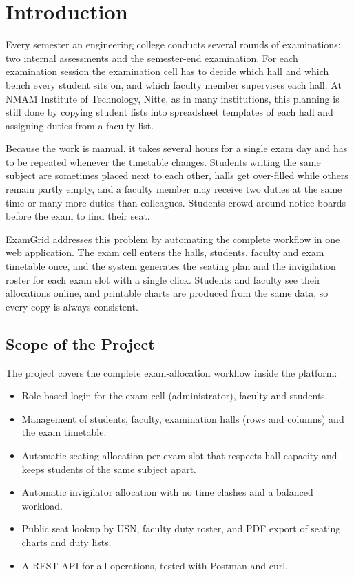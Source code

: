 \documentclass[12pt,letterpaper]{article}
\renewcommand{\thesection}{\arabic{section}}
\newcommand{\chapter}[1]{\clearpage\refstepcounter{section}\section*{#1}\label{ch:\thesection}}
\begin{document}
\pagestyle{body}

\chapter{Introduction}
Every semester an engineering college conducts several rounds of examinations: two internal assessments and the semester-end examination. For each examination session the examination cell has to decide which hall and which bench every student sits on, and which faculty member supervises each hall. At NMAM Institute of Technology, Nitte, as in many institutions, this planning is still done by copying student lists into spreadsheet templates of each hall and assigning duties from a faculty list.

Because the work is manual, it takes several hours for a single exam day and has to be repeated whenever the timetable changes. Students writing the same subject are sometimes placed next to each other, halls get over-filled while others remain partly empty, and a faculty member may receive two duties at the same time or many more duties than colleagues. Students crowd around notice boards before the exam to find their seat.

ExamGrid addresses this problem by automating the complete workflow in one web application. The exam cell enters the halls, students, faculty and exam timetable once, and the system generates the seating plan and the invigilation roster for each exam slot with a single click. Students and faculty see their allocations online, and printable charts are produced from the same data, so every copy is always consistent.

\subsection{Scope of the Project}
The project covers the complete exam-allocation workflow inside the platform:
\begin{itemize}
  \item Role-based login for the exam cell (administrator), faculty and students.
  \item Management of students, faculty, examination halls (rows and columns) and the exam timetable.
  \item Automatic seating allocation per exam slot that respects hall capacity and keeps students of the same subject apart.
  \item Automatic invigilator allocation with no time clashes and a balanced workload.
  \item Public seat lookup by USN, faculty duty roster, and PDF export of seating charts and duty lists.
  \item A REST API for all operations, tested with Postman and curl.
\end{itemize}
\end{document}
